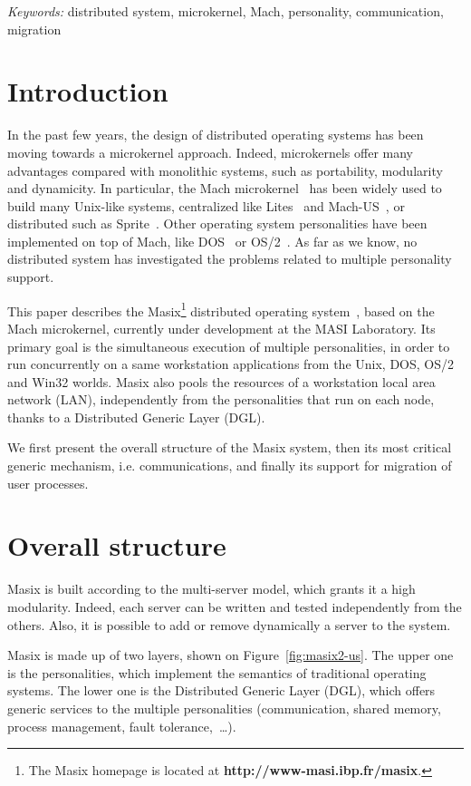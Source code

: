\noindent

{\it Keywords:} 
{\small distributed system, microkernel, Mach, personality, communication, migration}

\section{Introduction}

In the past few years, the design of distributed operating systems has been
moving towards a microkernel approach. 
Indeed, microkernels offer many advantages compared with monolithic systems, 
such as portability, modularity and dynamicity.
In particular, the Mach microkernel~\cite{mach:foundation} has been
widely used to build many Unix-like systems, centralized like
Lites~\cite{Helander94} and Mach-US~\cite{mach-us95}, or distributed
such as Sprite~\cite{Kupfer93}. Other operating system personalities have
been implemented on top of Mach, like DOS~\cite{dos91} or OS/2~\cite{os293}.
As far as we know, no distributed system has investigated the problems
related to multiple personality support.

This paper describes the Masix\footnote{The Masix homepage is located at {\bf http://www-masi.ibp.fr/masix}.} distributed operating system~\cite{masix:osf}, based on the Mach microkernel, currently under development at the MASI Laboratory. 
Its primary goal is the simultaneous
execution of multiple personalities, in order to run concurrently on 
a same workstation applications from the Unix, DOS, OS/2 and Win32 worlds.
Masix also pools the resources of a workstation local area network (LAN), independently from
the personalities that run on each node, thanks to a Distributed Generic
Layer (DGL).
 
We first present the overall structure of the Masix system, then its 
most critical generic mechanism, i.e. communications, and finally its support
for migration of user processes.

\section {Overall structure}

Masix is built according to the multi-server model, which grants it a high
modularity. Indeed, each server can be written and tested independently from
the others. Also, it is possible to add or remove dynamically a server to
the system.

Masix is made up of two layers, shown on Figure~\ref{fig:masix2-us}. The upper
one is the personalities, which implement the semantics of traditional
operating systems. The lower one is
the Distributed Generic Layer (DGL), which offers generic
services to the multiple personalities (communication, shared memory,
process management, fault tolerance,~\dots).

